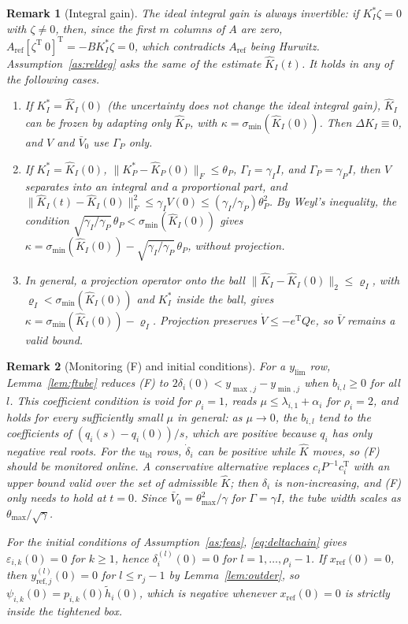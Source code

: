\documentclass[lettersize,journal]{IEEEtran}
\newtheorem{remark}{Remark}
\newcommand{\Kh}{\hat{K}}
\newcommand{\xr}{x_{\mathrm{ref}}}
\newcommand{\Ar}{A_{\mathrm{ref}}}
\newcommand{\ub}{u_{\mathrm{bl}}}
\newcommand{\ylim}{y_{\mathrm{lim}}}
\newcommand{\Vb}{\bar{V}}
\newcommand{\tmax}{\theta_{\max}}
\newcommand{\T}{\mathrm{T}}
\begin{document}
\begin{remark}[Integral gain] \label{rem:KI}
The ideal integral gain is always invertible: if $K_I^*\zeta=0$ with $\zeta\ne0$, then, since the first $m$ columns of $A$ are zero, $\Ar[\zeta^\T\ 0]^\T=-BK_I^*\zeta=0$, which contradicts $\Ar$ being Hurwitz. Assumption~\ref{as:reldeg} asks the same of the estimate $\Kh_I(t)$. It holds in any of the following cases.
\begin{enumerate}
\item If $K_I^*=\Kh_I(0)$ (the uncertainty does not change the ideal integral gain), $\Kh_I$ can be frozen by adapting only $\Kh_P$, with $\kappa=\sigma_{\min}(\Kh_I(0))$. Then $\Delta K_I\equiv0$, and $V$ and $\Vb_0$ use $\Gamma_P$ only.
\item If $K_I^*=\Kh_I(0)$, $\|K_P^*-\Kh_P(0)\|_F\le\theta_P$, $\Gamma_I=\gamma_II$, and $\Gamma_P=\gamma_PI$, then $V$ separates into an integral and a proportional part, and $\|\Kh_I(t)-\Kh_I(0)\|_F^2\le\gamma_IV(0)\le(\gamma_I/\gamma_P)\theta_P^2$. By Weyl's inequality, the condition $\sqrt{\gamma_I/\gamma_P}\,\theta_P<\sigma_{\min}(\Kh_I(0))$ gives $\kappa=\sigma_{\min}(\Kh_I(0))-\sqrt{\gamma_I/\gamma_P}\,\theta_P$, without projection.
\item In general, a projection operator onto the ball $\|\Kh_I-\Kh_I(0)\|_2\le\varrho_I$, with $\varrho_I<\sigma_{\min}(\Kh_I(0))$ and $K_I^*$ inside the ball, gives $\kappa=\sigma_{\min}(\Kh_I(0))-\varrho_I$. Projection preserves $\dot V\le-e^\T Qe$, so $\Vb$ remains a valid bound.
\end{enumerate}
\end{remark}

\begin{remark}[Monitoring (F) and initial conditions]
For a $\ylim$ row, Lemma~\ref{lem:ftube} reduces (F) to $2\delta_i(0)<y_{\max,j}-y_{\min,j}$ when $b_{i,l}\ge0$ for all $l$. This coefficient condition is void for $\rho_i=1$, reads $\mu\le\lambda_{i,1}+\alpha_i$ for $\rho_i=2$, and holds for every sufficiently small $\mu$ in general: as $\mu\to0$, the $b_{i,l}$ tend to the coefficients of $(q_i(s)-q_i(0))/s$, which are positive because $q_i$ has only negative real roots. For the $\ub$ rows, $\dot\delta_i$ can be positive while $\Kh$ moves, so (F) should be monitored online. A conservative alternative replaces $c_iP^{-1}c_i^\T$ with an upper bound valid over the set of admissible $\Kh$; then $\delta_i$ is non-increasing, and (F) only needs to hold at $t=0$. Since $\Vb_0=\tmax^2/\gamma$ for $\Gamma=\gamma I$, the tube width scales as $\tmax/\sqrt{\gamma}$.

For the initial conditions of Assumption~\ref{as:feas}, \eqref{eq:deltachain} gives $\varepsilon_{i,k}(0)=0$ for $k\ge1$, hence $\delta_i^{(l)}(0)=0$ for $l=1,\dots,\rho_i-1$. If $\xr(0)=0$, then $y^{(l)}_{\mathrm{ref},j}(0)=0$ for $l\le r_j-1$ by Lemma~\ref{lem:outder}, so $\psi_{i,k}(0)=p_{i,k}(0)\tilde h_i(0)$, which is negative whenever $\xr(0)=0$ is strictly inside the tightened box.
\end{remark}
\end{document}
